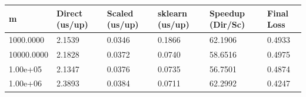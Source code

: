 \begin{table}[htbp]
\centering
\begin{tabular}{llllll}
\toprule
m & Direct (us/up) & Scaled (us/up) & sklearn (us/up) & Speedup (Dir/Sc) & Final Loss \\
\midrule
1000.0000 & 2.1539 & 0.0346 & 0.1866 & 62.1906 & 0.4933 \\
10000.0000 & 2.1828 & 0.0372 & 0.0740 & 58.6516 & 0.4975 \\
1.00e+05 & 2.1347 & 0.0376 & 0.0735 & 56.7501 & 0.4874 \\
1.00e+06 & 2.3893 & 0.0384 & 0.0711 & 62.2992 & 0.4247 \\
\bottomrule
\end{tabular}
\end{table}
